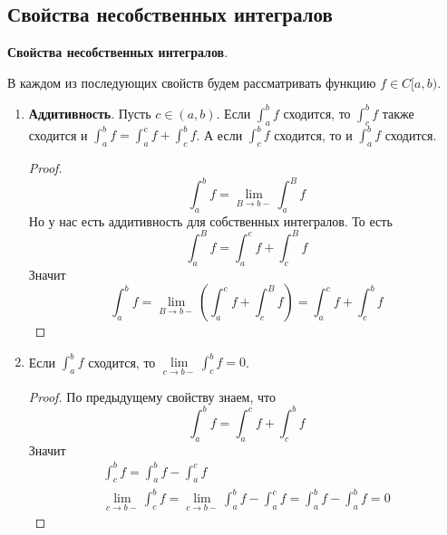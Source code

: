 \subsection{Свойства несобственных интегралов}
\textbf{Свойства несобственных интегралов}.

В каждом из последующих свойств будем рассматривать функцию $f \in C[a, b)$.

\begin{enumerate}
  \item \textbf{Аддитивность}. Пусть $c \in (a, b)$. Если $\int_{a}^{b} f$ сходится, то $\int_{c}^{b} f$ также сходится и $\int_{a}^{b} f = \int_{a}^{c} f + \int_{c}^{b} f$. А если $\int_{c}^{b} f$ сходится, то и $\int_{a}^{b} f$ сходится.
  \begin{proof}
    \begin{equation*}
      \int_{a}^{b} f = \lim\limits_{B \to b-} \int_{a}^{B} f
    \end{equation*}
    Но у нас есть аддитивность для собственных интегралов. То есть
    \begin{equation*}
      \int_{a}^{B} f = \int_{a}^{c} f + \int_{c}^{B} f
    \end{equation*}
    Значит
    \begin{equation*}
      \int_{a}^{b} f = \lim\limits_{B \to b-} \left( \int_{a}^{c} f + \int_{c}^{B} f \right) =
      \int_{a}^{c} f + \int_{c}^{b} f
    \end{equation*}
  \end{proof}

  \item Если $\int_{a}^{b} f$ сходится, то $\lim\limits_{c \to b-} \int_{c}^{b} f = 0$.
  \begin{proof}
    По предыдущему свойству знаем, что
    \begin{equation*}
      \int_{a}^{b} f = \int_{a}^{c} f + \int_{c}^{b} f
    \end{equation*}
    Значит
    \begin{equation*}
      \begin{gathered}
        \int_{c}^{b} f = \int_{a}^{b} f - \int_{a}^{c} f \\
        \lim\limits_{c \to b-} \int_{c}^{b} f = \lim\limits_{c \to b-} \int_{a}^{b} f - \int_{a}^{c} f = \int_{a}^{b} f - \int_{a}^{b} f = 0
      \end{gathered}
    \end{equation*}
  \end{proof}


\end{enumerate}
